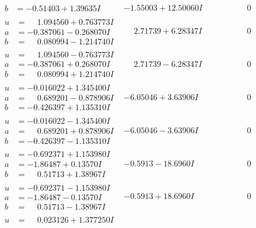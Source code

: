 \documentclass[1p]{elsarticle_modified}
\theoremstyle{definition}
\begin{document}
$$\begin{array}{c|c|c}
\begin{aligned}
b &= -0.51403 + 1.39635 I\end{aligned}
 & -1.55003 + 12.50060 I & \phantom{-0.000000 } 0 \\ \hline\begin{aligned}
u &= \phantom{-}1.094560 + 0.763773 I \\
a &= -0.387061 - 0.268070 I \\
b &= \phantom{-}0.080994 - 1.214740 I\end{aligned}
 & \phantom{-}2.71739 + 6.28347 I & \phantom{-0.000000 } 0 \\ \hline\begin{aligned}
u &= \phantom{-}1.094560 - 0.763773 I \\
a &= -0.387061 + 0.268070 I \\
b &= \phantom{-}0.080994 + 1.214740 I\end{aligned}
 & \phantom{-}2.71739 - 6.28347 I & \phantom{-0.000000 } 0 \\ \hline\begin{aligned}
u &= -0.016022 + 1.345400 I \\
a &= \phantom{-}0.689201 - 0.878906 I \\
b &= -0.426397 + 1.135310 I\end{aligned}
 & -6.05046 + 3.63906 I & \phantom{-0.000000 } 0 \\ \hline\begin{aligned}
u &= -0.016022 - 1.345400 I \\
a &= \phantom{-}0.689201 + 0.878906 I \\
b &= -0.426397 - 1.135310 I\end{aligned}
 & -6.05046 - 3.63906 I & \phantom{-0.000000 } 0 \\ \hline\begin{aligned}
u &= -0.692371 + 1.153980 I \\
a &= -1.86487 + 0.13570 I \\
b &= \phantom{-}0.51713 + 1.38967 I\end{aligned}
 & -0.5913 - 18.6960 I & \phantom{-0.000000 } 0 \\ \hline\begin{aligned}
u &= -0.692371 - 1.153980 I \\
a &= -1.86487 - 0.13570 I \\
b &= \phantom{-}0.51713 - 1.38967 I\end{aligned}
 & -0.5913 + 18.6960 I & \phantom{-0.000000 } 0 \\ \hline\begin{aligned}
u &= \phantom{-}0.023126 + 1.377250 I \\

\end{aligned}
\end{array}$$
\end{document}
